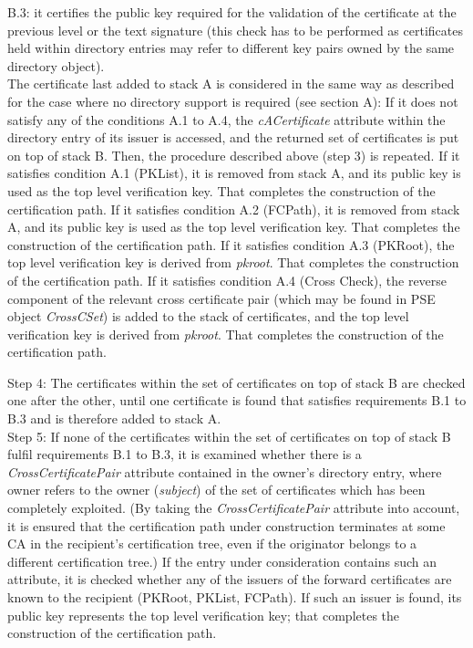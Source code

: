 B.3: it certifies the public key required for the validation of the certificate
at the previous level or the text signature 
(this check has to be performed as certificates held within directory entries 
may refer to different key pairs owned by the same directory object).
\\ [1em]
The certificate last added to stack A is considered in the same way as
described for the case where no directory support is required (see section A): 
\bi
\m If it does not satisfy any of the conditions A.1 to A.4, the {\em cACertificate} attribute 
within the directory entry of its issuer is accessed, and the returned set of 
certificates is put on top of stack B. Then, the procedure described above 
(step 3) is repeated.
\m If it satisfies condition A.1 (PKList), it is removed from stack A, and its 
public key is used as the top level verification key. That completes 
the construction of the certification path.
\m If it satisfies condition A.2 (FCPath), it is removed from stack A, and its 
public key is used as the top level verification key. That completes 
the construction of the certification path.
\m If it satisfies condition A.3 (PKRoot), the top level verification key is 
derived from {\em pkroot}. That completes the construction of the 
certification path.
\m If it satisfies condition A.4 (Cross Check), the 
reverse component of the relevant cross certificate pair (which may be found in PSE
object {\em CrossCSet}) is added to the stack of certificates, and the top level verification key is 
derived from {\em pkroot}. That completes the construction of the 
certification path.
\ei

Step 4: The certificates within the set of certificates on top of stack B
are checked one after the other, until one certificate is found that
satisfies requirements B.1 to B.3 and is therefore added to stack A.
\\ [1em]
Step 5: If none of the certificates within the set of certificates on top
of stack B fulfil requirements B.1 to B.3, it is
examined whether there is a {\em CrossCertificatePair} attribute contained
in the owner's directory entry, where owner refers to the owner ({\em subject})
of the set of certificates which has been completely exploited.
(By taking the {\em CrossCertificatePair} attribute into account, it is ensured
that the certification path under construction terminates at some CA in the
recipient's certification tree, even if the originator belongs to a 
different certification tree.) If the entry under consideration contains such
an attribute, it is checked whether
any of the issuers of the forward certificates are known to the recipient
(PKRoot, PKList, FCPath). If such an issuer is found, its public key represents the
top level verification key; that completes the construction of the 
certification path.

